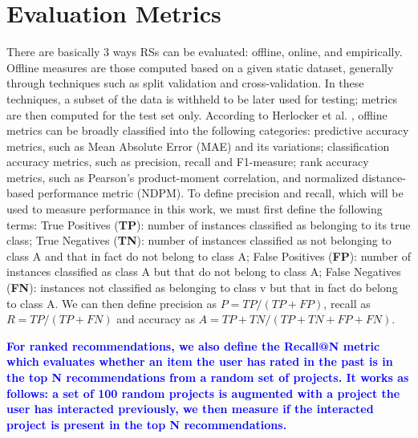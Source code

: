 \documentclass[cic,tc,english]{iiufrgs}
\newcommand{\adriano}[1]{\textcolor{blue}{\textbf{#1}}}
\begin{document}
\section{Evaluation Metrics} \label{metrics}
There are basically 3 ways RSs can be evaluated: offline, online, and empirically. Offline measures are those computed based on a given static dataset, generally through techniques such as split validation and cross-validation. In these techniques, a subset of the data is withheld to be later used for testing; metrics are then computed for the test set only. According to Herlocker et al. \cite{Herlocker2004}, offline metrics can be broadly classified into the following categories: predictive accuracy metrics, such as Mean Absolute Error (MAE) and its variations; classification accuracy metrics, such as precision, recall and F1-measure; rank accuracy metrics, such as Pearson’s product-moment correlation, and normalized distance-based performance metric (NDPM). To define precision and recall, which will be used to measure performance in this work, we must first define the following terms: True Positives (\textbf{TP}): number of instances classified as belonging to its true class; True Negatives (\textbf{TN}): number of instances classified as not belonging to class A and that in fact do not belong to class A; False Positives (\textbf{FP}): number of instances classified as class A but that do not belong to class A; False Negatives (\textbf{FN}): instances not classified as belonging to class v but that in fact do belong to class A. We can then define precision as $P = T P/(T P + F P)$, recall as $R = TP/(TP+FN)$ and accuracy as $A = TP + TN/(TP+TN+FP+FN)$.

\adriano{For ranked recommendations, we also define the Recall@N metric which evaluates whether an item the user has rated in the past is in the top N recommendations from a random set of projects. It works as follows: a set of 100 random projects is augmented with a project the user has interacted previously, we then measure if the interacted project is present in the top N recommendations.}
\end{document}
